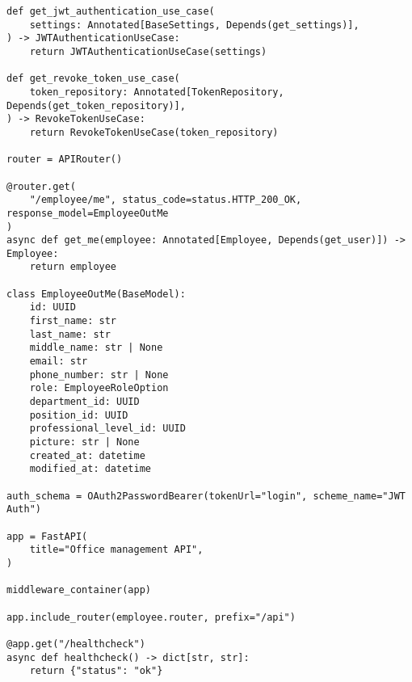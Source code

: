 \begin{lstlisting}[style=pythonstyle]
def get_jwt_authentication_use_case(
    settings: Annotated[BaseSettings, Depends(get_settings)],
) -> JWTAuthenticationUseCase:
    return JWTAuthenticationUseCase(settings)

def get_revoke_token_use_case(
    token_repository: Annotated[TokenRepository, Depends(get_token_repository)],
) -> RevokeTokenUseCase:
    return RevokeTokenUseCase(token_repository)

router = APIRouter()

@router.get(
    "/employee/me", status_code=status.HTTP_200_OK, response_model=EmployeeOutMe
)
async def get_me(employee: Annotated[Employee, Depends(get_user)]) -> Employee:
    return employee

class EmployeeOutMe(BaseModel):
    id: UUID
    first_name: str
    last_name: str
    middle_name: str | None
    email: str
    phone_number: str | None
    role: EmployeeRoleOption
    department_id: UUID
    position_id: UUID
    professional_level_id: UUID
    picture: str | None
    created_at: datetime
    modified_at: datetime

auth_schema = OAuth2PasswordBearer(tokenUrl="login", scheme_name="JWT Auth")

app = FastAPI(
    title="Office management API",
)

middleware_container(app)

app.include_router(employee.router, prefix="/api")

@app.get("/healthcheck")
async def healthcheck() -> dict[str, str]:
    return {"status": "ok"}
\end{lstlisting}
